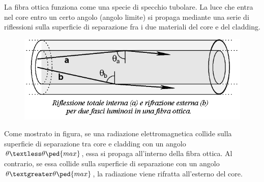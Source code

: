 \documentclass[a4paper,11pt]{article}
\begin{document}
La fibra ottica funziona come una specie di specchio tubolare. La luce che entra nel core entro un certo angolo (angolo limite) si propaga mediante una serie di riflessioni sulla superficie di separazione fra i due materiali del core e del cladding.

\begin{center} 
\begin{figure}[htpd]
\hspace{90 pt}
\includegraphics[scale=0.90]{Fibra_ottica2.png}


\end{figure}
\end{center}

Come mostrato in figura, se una radiazione elettromagnetica collide sulla superficie di separazione tra core e cladding con un angolo $\theta \textless \theta \ped{max}$, essa si propaga all'interno della fibra ottica. Al contrario, se essa 
collide sulla superficie di separazione con un angolo $\theta \textgreater \theta \ped{max}$, la radiazione viene rifratta all'esterno del core. 
\end{document}
